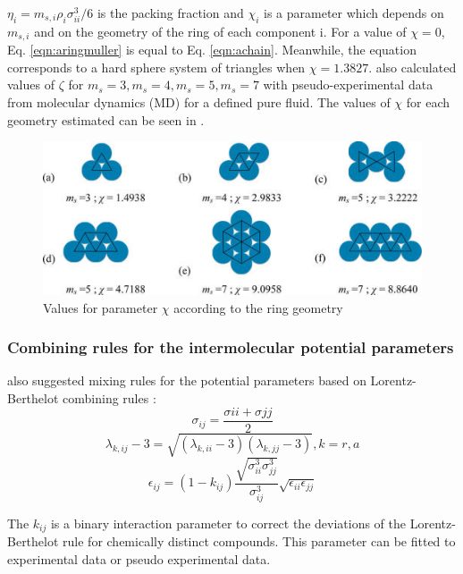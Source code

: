 $\eta_{i}=m_{s,i}\rho_{i}\sigma_{ii}^{3}/6$ is the packing fraction and $\chi_{i}$ is a parameter which depends on $m_{s,i}$ and on the geometry of the ring of each component i. For a value of $\chi=0$, Eq. \eqref{eqn:aringmuller} is equal to Eq. \eqref{eqn:achain}. Meanwhile, the equation corresponds to a hard sphere system of triangles when $\chi=1.3827$.  also calculated values of $\zeta$ for $m_{s}=3,m_{s}=4,m_{s}=5,m_{s}=7$ with pseudo-experimental data from molecular dynamics (MD) for a defined pure fluid. The values of $\chi$ for each geometry estimated can be seen in .
\begin{figure}[th]
	\centering
	\includegraphics[scale=0.9]{Figures/mullergeo.jpg}
	\caption{Values for parameter $\chi$ according to the ring geometry \cite{muller2017}}
	\label{ringqsi}
\end{figure}

\subsubsection{Combining rules for the intermolecular potential parameters}
 also suggested mixing rules for the potential parameters based on Lorentz-Berthelot combining rules \cite{rowlinson}:
\begin{equation}
\sigma_{ij} =\frac{\sigma{ii}+\sigma{jj}}{2}
\label{eqn:sigmamix}
\end{equation}
\begin{equation}
\lambda_{k,ij} -3 =\sqrt{(\lambda_{k,ii}-3)(\lambda_{k,jj}-3)} , k=r,a
\label{eqn:lambdamix}
\end{equation}
\begin{equation}
\epsilon_{ij} =(1-k_{ij})\frac{\sqrt{\sigma_{ii}^{3}\sigma_{jj}^{3}}}{\sigma_{ij}^{3}}\sqrt{\epsilon_{ii}\epsilon_{jj}}
\label{eqn:epsmix}
\end{equation}

The $k_{ij}$ is a binary interaction parameter to correct the deviations of the Lorentz-Berthelot rule for chemically distinct compounds. This parameter can be fitted to experimental data or pseudo experimental data.


